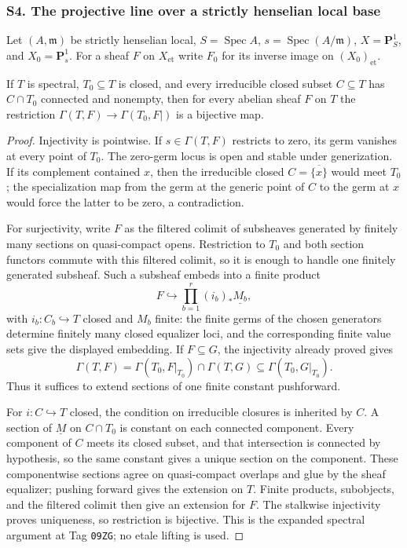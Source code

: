 \subsubsection{S4. The projective line over a strictly henselian local base}

\begin{definition}
\label{def:weil-pbc-strict-henselian-setup}
\uses{}
Let $(A,\mathfrak m)$ be strictly henselian local, $S=\operatorname{Spec}A$,
$s=\operatorname{Spec}(A/\mathfrak m)$, $X=\mathbf P^1_S$, and
$X_0=\mathbf P^1_s$.  For a sheaf $F$ on $X_{\mathrm{et}}$ write
$F_0$ for its inverse image on $(X_0)_{\mathrm{et}}$.
\end{definition}

\begin{lemma}
\label{lemma:weil-pbc-spectral-restriction}
\uses{}
If $T$ is spectral, $T_0\subseteq T$ is closed, and every irreducible closed
subset $C\subseteq T$ has $C\cap T_0$ connected and nonempty, then for every
abelian sheaf $F$ on $T$ the restriction $\Gamma(T,F)\to\Gamma(T_0,F|)$ is a
bijective map.
\end{lemma}
\begin{proof}
\uses{} 
Injectivity is pointwise.  If $s\in\Gamma(T,F)$ restricts to zero, its germ
vanishes at every point of $T_0$.  The zero-germ locus is open and stable under
generization.  If its complement contained $x$, then the irreducible closed
$C=\overline{\{x\}}$ would meet $T_0$; the specialization map from the germ
at the generic point of $C$ to the germ at $x$ would force the latter to be
zero, a contradiction.

For surjectivity, write $F$ as the filtered colimit of subsheaves generated
by finitely many sections on quasi-compact opens.  Restriction to $T_0$ and
both section functors commute with this filtered colimit, so it is enough to
handle one finitely generated subsheaf.  Such a subsheaf embeds into a finite
product
\[
 F\hookrightarrow\prod_{b=1}^r(i_b)_*\underline{M_b},
\]
with $i_b:C_b\hookrightarrow T$ closed and $M_b$ finite: the finite germs of
the chosen generators determine finitely many closed equalizer loci, and the
corresponding finite value sets give the displayed embedding.  If $F\subseteq
G$, the injectivity already proved gives
\[
 \Gamma(T,F)=\Gamma(T_0,F|_{T_0})\cap\Gamma(T,G)
 \subseteq\Gamma(T_0,G|_{T_0}).
\]
Thus it suffices to extend sections of one finite constant pushforward.

For $i:C\hookrightarrow T$ closed, the condition on irreducible closures is
inherited by $C$.  A section of $\underline M$ on $C\cap T_0$ is constant on
each connected component.  Every component of $C$ meets its closed subset,
and that intersection is connected by hypothesis, so the same constant gives
a unique section on the component.  These componentwise sections agree on
quasi-compact overlaps and glue by the sheaf equalizer; pushing forward gives
the extension on $T$.  Finite products, subobjects, and the filtered colimit
then give an extension for $F$.  The stalkwise injectivity proves uniqueness,
so restriction is bijective.  This is the expanded spectral argument at Tag
\texttt{09ZG}; no etale lifting is used.
\end{proof}

